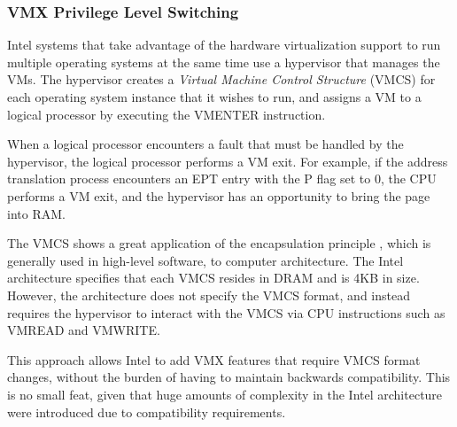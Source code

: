 \subsubsection{VMX Privilege Level Switching}
\label{sec:vmx}


Intel systems that take advantage of the hardware virtualization support to run
multiple operating systems at the same time use a hypervisor that manages the
VMs. The hypervisor creates a \textit{Virtual Machine Control Structure} (VMCS)
for each operating system instance that it wishes to run, and assigns a VM to a
logical processor by executing the VMENTER instruction.


When a logical processor encounters a fault that must be handled by the
hypervisor, the logical processor performs a VM exit. For example, if the
address translation process encounters an EPT entry with the P flag set to 0,
the CPU performs a VM exit, and the hypervisor has an opportunity to bring the
page into RAM.

The VMCS shows a great application of the encapsulation principle
\cite{liskov1974adt}, which is generally used in high-level software, to
computer architecture. The Intel architecture specifies that each VMCS resides
in DRAM and is 4KB in size. However, the architecture does not specify the VMCS
format, and instead requires the hypervisor to interact with the VMCS via CPU
instructions such as VMREAD and VMWRITE.

This approach allows Intel to add VMX features that require VMCS format
changes, without the burden of having to maintain backwards compatibility.
This is no small feat, given that huge amounts of complexity in the Intel
architecture were introduced due to compatibility requirements.

